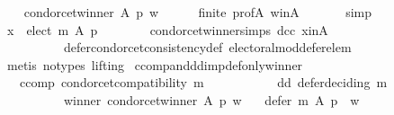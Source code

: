 \begin{isabellebody}
\ \ \isamarkupfalse%
\ {\isachardoublequoteopen}condorcet{\isacharunderscore}{\kern0pt}winner\ A\ p\ w{\isachardoublequoteclose}\isanewline
\ \ \ \ \isamarkupfalse%
\ finite\ prof{\isacharunderscore}{\kern0pt}A\ w{\isacharunderscore}{\kern0pt}in{\isacharunderscore}{\kern0pt}A\ {\isachardoublequoteopen}{}{\isachardoublequoteclose}\isanewline
\ \ \ \ \isamarkupfalse%
\ simp\isanewline
\ \ \isamarkupfalse%
\ {\isachardoublequoteopen}x\ {\isasymin}\ elect\ m\ A\ p{\isachardoublequoteclose}\isanewline
\ \ \ \ \isamarkupfalse%
\ {\isachardoublequoteopen}{}{\isachardoublequoteclose}\ {\isachardoublequoteopen}{}{\isachardoublequoteclose}\ condorcet{\isacharunderscore}{\kern0pt}winner{\isachardot}{\kern0pt}simps\ dcc\ x{\isacharunderscore}{\kern0pt}in{\isacharunderscore}{\kern0pt}A\isanewline
\ \ \ \ \ \ \ \ \ \ defer{\isacharunderscore}{\kern0pt}condorcet{\isacharunderscore}{\kern0pt}consistency{\isacharunderscore}{\kern0pt}def\ electoral{\isacharunderscore}{\kern0pt}mod{\isacharunderscore}{\kern0pt}defer{\isacharunderscore}{\kern0pt}elem\isanewline
\ \ \ \ \isamarkupfalse%
\ {\isacharparenleft}{\kern0pt}metis\ {\isacharparenleft}{\kern0pt}no{\isacharunderscore}{\kern0pt}types{\isacharcomma}{\kern0pt}\ lifting{\isacharparenright}{\kern0pt}{\isacharparenright}{\kern0pt}\isanewline
{}\isamarkupfalse%
%
\endisatagproof
{\isafoldproof}%
%
\isadelimproof
\isanewline
%
\endisadelimproof
\isanewline
{}\isamarkupfalse%
\ ccomp{\isacharunderscore}{\kern0pt}and{\isacharunderscore}{\kern0pt}dd{\isacharunderscore}{\kern0pt}imp{\isacharunderscore}{\kern0pt}def{\isacharunderscore}{\kern0pt}only{\isacharunderscore}{\kern0pt}winner{\isacharcolon}{\kern0pt}\isanewline
\ \ \ ccomp{\isacharcolon}{\kern0pt}\ {\isachardoublequoteopen}condorcet{\isacharunderscore}{\kern0pt}compatibility\ m{\isachardoublequoteclose}\ \isanewline
\ \ \ \ \ \ \ \ \ \ dd{\isacharcolon}{\kern0pt}\ {\isachardoublequoteopen}defer{\isacharunderscore}{\kern0pt}deciding\ m{\isachardoublequoteclose}\ \isanewline
\ \ \ \ \ \ \ \ \ \ winner{\isacharcolon}{\kern0pt}\ {\isachardoublequoteopen}condorcet{\isacharunderscore}{\kern0pt}winner\ A\ p\ w{\isachardoublequoteclose}\isanewline
\ \ \ {\isachardoublequoteopen}defer\ m\ A\ p\ {\isacharequal}{\kern0pt}\ {\isacharbraceleft}{\kern0pt}w{\isacharbraceright}{\kern0pt}{\isachardoublequoteclose}\isanewline
%
\isadelimproof
%
\endisadelimproof

\end{isabellebody}
